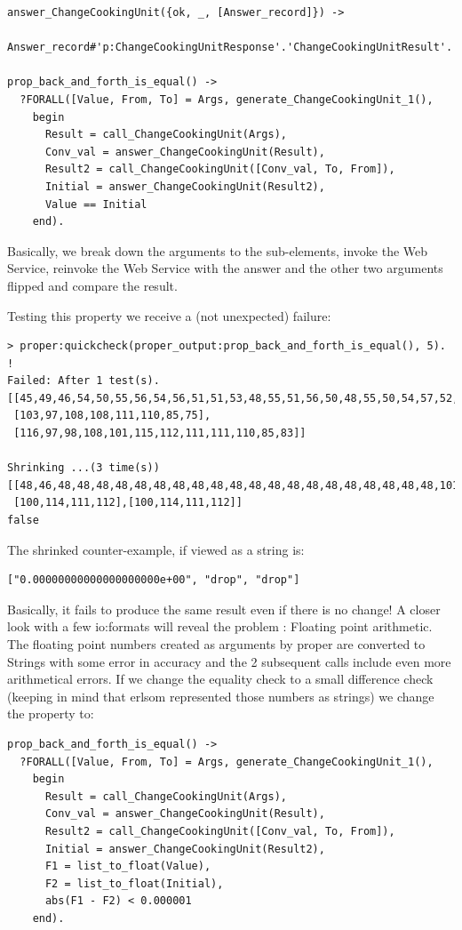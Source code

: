 \documentclass[submission,copyright,a4]{eptcs}
\begin{document}
\begin{lstlisting}
answer_ChangeCookingUnit({ok, _, [Answer_record]}) -> 
  Answer_record#'p:ChangeCookingUnitResponse'.'ChangeCookingUnitResult'.

prop_back_and_forth_is_equal() ->
  ?FORALL([Value, From, To] = Args, generate_ChangeCookingUnit_1(),
    begin
      Result = call_ChangeCookingUnit(Args),
      Conv_val = answer_ChangeCookingUnit(Result),
      Result2 = call_ChangeCookingUnit([Conv_val, To, From]),
      Initial = answer_ChangeCookingUnit(Result2),
      Value == Initial
    end).
\end{lstlisting}

Basically, we break down the arguments to the sub-elements, invoke the Web Service, reinvoke the Web Service with the answer and the other two arguments flipped and compare the result. 

Testing this property we receive a (not unexpected) failure:

\begin{lstlisting}
> proper:quickcheck(proper_output:prop_back_and_forth_is_equal(), 5).
!
Failed: After 1 test(s).
[[45,49,46,54,50,55,56,54,56,51,51,53,48,55,51,56,50,48,55,50,54,57,52,101,45,48,49],
 [103,97,108,108,111,110,85,75],
 [116,97,98,108,101,115,112,111,111,110,85,83]]

Shrinking ...(3 time(s))
[[48,46,48,48,48,48,48,48,48,48,48,48,48,48,48,48,48,48,48,48,48,48,101,43,48,48],
 [100,114,111,112],[100,114,111,112]]
false
\end{lstlisting}

The shrinked counter-example, if viewed as a string is:

\begin{lstlisting}
["0.00000000000000000000e+00", "drop", "drop"]
\end{lstlisting}

Basically, it fails to produce the same result even if there is no change! A closer look with a few io:formats will reveal the problem : Floating point arithmetic. The floating point numbers created as arguments by proper are converted to Strings with some error in accuracy and the 2 subsequent calls include even more arithmetical errors. If we change the equality check to a small difference check (keeping in mind that erlsom represented those numbers as strings) we change the property to:

\begin{lstlisting}
prop_back_and_forth_is_equal() ->
  ?FORALL([Value, From, To] = Args, generate_ChangeCookingUnit_1(),
    begin
      Result = call_ChangeCookingUnit(Args),
      Conv_val = answer_ChangeCookingUnit(Result),
      Result2 = call_ChangeCookingUnit([Conv_val, To, From]),
      Initial = answer_ChangeCookingUnit(Result2),
      F1 = list_to_float(Value),
      F2 = list_to_float(Initial),
      abs(F1 - F2) < 0.000001
    end).
\end{lstlisting}
\end{document}
